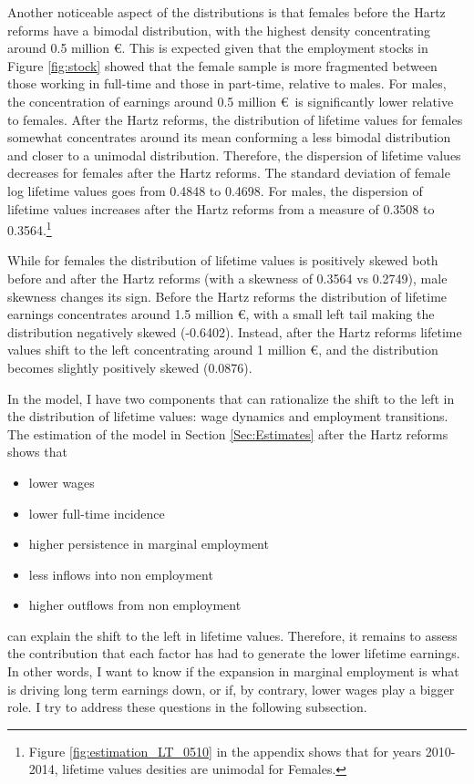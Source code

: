 \documentclass[12pt, a4paper]{article}
\begin{document}
Another noticeable aspect of the distributions is that females before the Hartz reforms have a bimodal distribution, with the highest density concentrating around 0.5 million \euro. This is expected given that the employment stocks in Figure \ref{fig:stock} showed that the female sample is more fragmented between those working in full-time and those in part-time, relative to males. For males, the concentration of earnings around 0.5 million \euro \, is significantly lower relative to females. After the Hartz reforms, the distribution of lifetime values for females somewhat concentrates around its mean conforming a less bimodal distribution and closer to a unimodal distribution. Therefore, the dispersion of lifetime values decreases for females after the Hartz reforms. The standard deviation of female log lifetime values goes from 0.4848 to 0.4698. For males, the dispersion of lifetime values increases after the Hartz reforms from a measure of 0.3508 to 0.3564.\footnote{Figure \ref{fig:estimation_LT_0510} in the appendix shows that for years 2010-2014, lifetime values desities are unimodal for Females.}

While for females the distribution of lifetime values is positively skewed both before and after the Hartz reforms (with a skewness of 0.3564 vs 0.2749), male skewness changes its sign. Before the Hartz reforms the distribution of lifetime earnings concentrates around 1.5 million \euro, with a small left tail making the distribution negatively skewed (-0.6402). Instead, after the Hartz reforms lifetime values shift to the left concentrating around 1 million \euro, and the distribution becomes slightly positively skewed (0.0876).

In the model, I have two components that can rationalize the shift to the left in the distribution of lifetime values: wage dynamics and employment transitions. The estimation of the model in Section \ref{Sec:Estimates} after the Hartz reforms shows that
\begin{itemize}
	\item lower wages
	\item lower full-time incidence
	\item higher persistence in marginal employment
	\item less inflows into non employment
	\item higher outflows from non employment
\end{itemize} 

can explain the shift to the left in lifetime values. Therefore, it remains to assess the contribution that each factor has had to generate the lower lifetime earnings. In other words, I want to know if the expansion in marginal employment is what is driving long term earnings down, or if, by contrary, lower wages play a bigger role. I try to address these questions in the following subsection.
\end{document}
